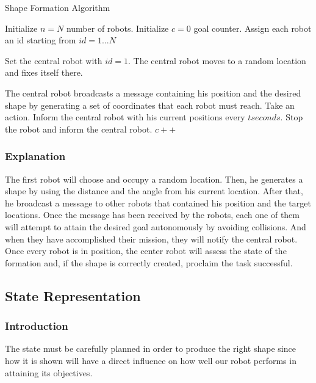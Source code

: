 \documentclass[12pt]{extarticle}
\begin{document}
\begin{algorithm}[H]
\caption{Shape Formation Algorithm}
\label{alg:ddpg}
\begin{algorithmic}[1]

\State Initialize $n=N$ number of robots.
\State Initialize $c=0$ goal counter.
\State Assign each robot an id starting from $id=1...N$

\State Set the central robot with $id=1$.
\State The central robot moves to a random location and fixes itself there.

\State The central robot broadcasts a message containing his position and the desired shape by generating a set of coordinates that each robot must reach.
\State Take an action.
\State Inform the central robot with his current positions every $t seconds$.
    \State Stop the robot and inform the central robot.
    \State $c++$ 

\EndIf 

\EndFor

\EndWhile

\end{algorithmic}
\end{algorithm}

\subsubsection{Explanation}



The first robot will choose and occupy a random location. Then, he generates a shape by using the distance and the angle from his current location. After that, he broadcast a message to other robots that contained his position and the target locations. Once the message has been received by the robots, each one of them will attempt to attain the desired goal autonomously by avoiding collisions. And when they have accomplished their mission, they will notify the central robot. Once every robot is in position, the center robot will assess the state of the formation and, if the shape is correctly created, proclaim the task successful.




\subsection{State Representation}

\subsubsection{Introduction}
The state must be carefully planned in order to produce the right shape since how it is shown will have a direct influence on how well our robot performs in attaining its objectives.
\end{document}
